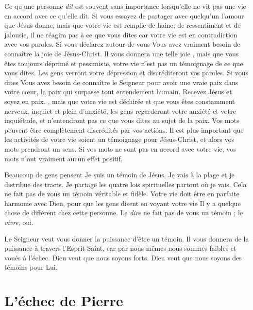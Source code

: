 Ce qu'une personne \emph{dit} est souvent sans importance
 lorsqu'elle ne vit pas une vie en accord avec ce qu'elle dit.
 Si vous essayez de partager avec quelqu'un l'amour que Jésus donne,
 mais que votre vie est remplie de haine, de ressentiment et de jalousie,
 il ne réagira pas à ce que vous dites car votre vie est en contradiction
 avec vos paroles. Si vous déclarez autour de vous\frcolon{}
 \Og Vous avez vraiment besoin de connaître la joie de Jésus-Christ.
 Il vous donnera une telle joie \Fg{}, mais que vous êtes toujours déprimé
 et pessimiste, votre vie n'est pas un témoignage de ce que vous dites.
 Les gens verront votre dépression et discréditeront vos paroles.
 Si vous dites\frcolon{} \Og Vous avez besoin de connaître le Seigneur pour avoir
 une vraie paix dans votre cœur, la paix qui surpasse
 tout entendement humain. Recevez Jésus et soyez en paix. \Fg{}, mais que votre vie est déchirée
 et que vous êtes constamment nerveux, inquiet et plein d'anxiété,
 les gens regarderont votre anxiété et votre inquiétude,
 et n'entendront pas ce que vous dites au sujet de la paix.
 Vos mots peuvent être complètement discrédités par vos actions.
 Il est plus important que les activités de votre vie soient
 un témoignage pour Jésus-Christ, et alors vos mots prendront un sens.
 Si vos mots ne sont pas en accord avec votre vie,
 vos mots n'ont vraiment aucun effet positif.

Beaucoup de gens pensent\frcolon{}
 \Og Je suis un témoin de Jésus. Je vais à la plage
 et je distribue des tracts. Je partage les quatre lois spirituelles
 partout où je vais. \Fg{}
 Cela ne fait pas de vous un témoin véritable et fidèle.
 Votre vie doit être en parfaite harmonie avec Dieu,
 pour que les gens disent en voyant votre vie\frcolon{}
 \Og Il y a quelque chose de différent chez cette personne. \Fg{}
 Le \emph{dire} ne fait pas de vous un témoin ; le \emph{vivre}, oui.

Le Seigneur veut vous donner la puissance d'être un témoin.
 Il vous donnera de la puissance à travers l'Esprit-Saint,
 car par nous-mêmes nous sommes faibles et voués à l'échec.
 Dieu veut que nous soyons forts.
 Dieu veut que nous soyons des témoins pour Lui.

\section{L'\'echec de Pierre}


